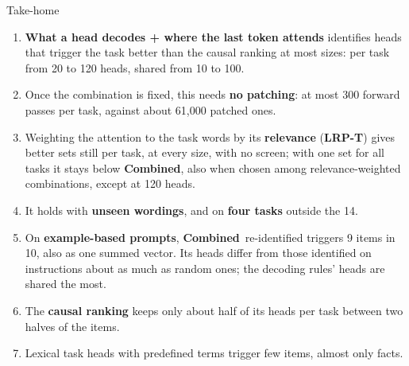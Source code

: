 \documentclass[aspectratio=169,11pt,xcolor=table]{beamer}
\newcommand{\Sel}{\textcolor{cSel}{\textbf{Combined}}}
\newcommand{\LRPT}{\textcolor{cLRP}{\textbf{LRP-T}}}
\begin{document}
\begin{frame}{Take-home}
\small
\begin{enumerate}\setlength{\itemsep}{0.3em}
\item \textbf{What a head decodes + where the last token attends} identifies heads that trigger the task
      better than the causal ranking at most sizes: per task from 20 to 120 heads, shared from 10 to 100.
\item Once the combination is fixed, this needs \textbf{no patching}: at most 300 forward passes per task,
      against about 61{,}000 patched ones.
\item Weighting the attention to the task words by its \textbf{relevance} (\LRPT) gives better sets still per task,
      at every size, with no screen; with one set for all tasks it stays below \Sel, also when chosen among
      relevance-weighted combinations, except at 120 heads.
\item It holds with \textbf{unseen wordings}, and on \textbf{four tasks} outside the 14.
\item On \textbf{example-based prompts}, \Sel\ re-identified triggers 9 items in 10, also as one summed vector.
      Its heads differ from those identified on instructions about as much as random ones;
      the decoding rules' heads are shared the most.
\item The \textbf{causal ranking} keeps only about half of its heads per task between two halves of the items.
\item Lexical task heads with predefined terms trigger few items, almost only facts.
\end{enumerate}
\end{frame}
\end{document}
